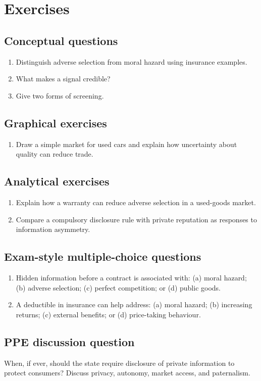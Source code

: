 \section*{Exercises}

\subsection*{Conceptual questions}
\begin{enumerate}[label=\arabic*.]
  \item Distinguish adverse selection from moral hazard using insurance examples.
  \item What makes a signal credible?
  \item Give two forms of screening.
\end{enumerate}

\subsection*{Graphical exercises}
\begin{enumerate}[resume,label=\arabic*.]
  \item Draw a simple market for used cars and explain how uncertainty about quality can reduce trade.
\end{enumerate}

\subsection*{Analytical exercises}
\begin{enumerate}[resume,label=\arabic*.]
  \item Explain how a warranty can reduce adverse selection in a used-goods market.
  \item Compare a compulsory disclosure rule with private reputation as responses to information asymmetry.
\end{enumerate}

\subsection*{Exam-style multiple-choice questions}
\begin{enumerate}[resume,label=\arabic*.]
  \item Hidden information before a contract is associated with: (a) moral hazard; (b) adverse selection; (c) perfect competition; or (d) public goods.
  \item A deductible in insurance can help address: (a) moral hazard; (b) increasing returns; (c) external benefits; or (d) price-taking behaviour.
\end{enumerate}

\subsection*{PPE discussion question}

\noindent When, if ever, should the state require disclosure of private information to protect consumers? Discuss privacy, autonomy, market access, and paternalism.
